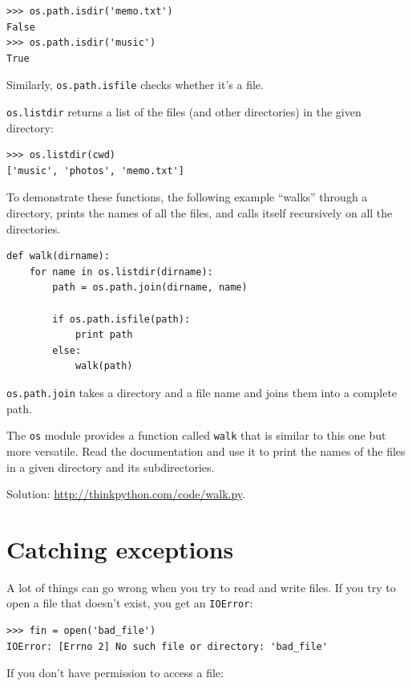 \documentclass[10pt]{book}
\begin{document}
\begin{CJK}{UTF8}{gbsn}
\begin{verbatim}
>>> os.path.isdir('memo.txt')
False
>>> os.path.isdir('music')
True
\end{verbatim}
%
Similarly, {\tt os.path.isfile} checks whether it's a file.

{\tt os.listdir} returns a list of the files (and other directories)
in the given directory:

\begin{verbatim}
>>> os.listdir(cwd)
['music', 'photos', 'memo.txt']
\end{verbatim}
%
To demonstrate these functions, the following example
``walks'' through a directory, prints
the names of all the files, and calls itself recursively on
all the directories.

\begin{verbatim}
def walk(dirname):
    for name in os.listdir(dirname):
        path = os.path.join(dirname, name)

        if os.path.isfile(path):
            print path
        else:
            walk(path)
\end{verbatim}
%
{\tt os.path.join} takes a directory and a file name and joins
them into a complete path.  

\begin{exercise}

The {\tt os} module provides a function called {\tt walk}
that is similar to this one but more versatile.  Read
the documentation and use it to print the names of the
files in a given directory and its subdirectories.

Solution: \url{http://thinkpython.com/code/walk.py}.

\end{exercise}


\section{Catching exceptions}
\label{catch}

A lot of things can go wrong when you try to read and write
files.  If you try to open a file that doesn't exist, you get an
{\tt IOError}:

\begin{verbatim}
>>> fin = open('bad_file')
IOError: [Errno 2] No such file or directory: 'bad_file'
\end{verbatim}
%
If you don't have permission to access a file:


\end{CJK}
\end{document}
